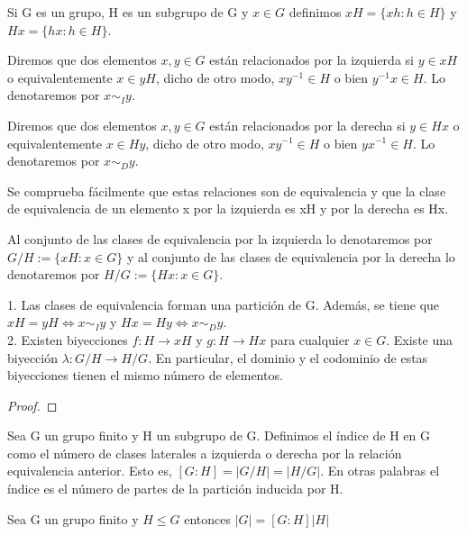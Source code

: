 \begin{definition}
Si G es un grupo, H es un subgrupo de G y $x \in G$ definimos $xH = \{xh:h \in H\}$ y $Hx = \{hx:h \in H\}$.

Diremos que dos elementos $x,y \in G$ están relacionados por la izquierda si $y \in xH$ o equivalentemente $x \in yH$, dicho de otro modo, $xy^{-1} \in H$ o bien $y^{-1}x \in H$. Lo denotaremos por $x \sim_{I} y$.

Diremos que dos elementos $x,y \in G$ están relacionados por la derecha si $y \in Hx$ o equivalentemente $x \in Hy$, dicho de otro modo, $xy^{-1} \in H$ o bien $yx^{-1} \in H$. Lo denotaremos por $x \sim_{D} y$.

Se comprueba fácilmente que estas relaciones son de equivalencia y que la clase de equivalencia de un elemento x por la izquierda es xH y por la derecha es Hx.

Al conjunto de las clases de equivalencia por la izquierda lo denotaremos por $G/H := \{xH : x \in G \}$ y al conjunto de las clases de equivalencia por la derecha lo denotaremos por $H/G := \{Hx : x \in G \}$.
\end{definition}

\begin{proposition}
1. Las clases de equivalencia forman una partición de G. Además, se tiene que $xH = yH \iff x \sim_{I} y$ y $Hx = Hy \iff x \sim_{D} y$. \\
2. Existen biyecciones $f:H \rightarrow xH$ y $g:H \rightarrow Hx$ para cualquier $x \in G$. Existe una biyección $\lambda:G/H \rightarrow H/G$. En particular, el dominio y el codominio de estas biyecciones tienen el mismo número de elementos.
\end{proposition}

\begin{proof}

\end{proof}

\begin{definition}
Sea G un grupo finito y H un subgrupo de G. Definimos el índice de H en G como el número de clases laterales a izquierda o derecha por la relación equivalencia anterior. Esto es, $[G:H] = |G/H| = |H/G|$. En otras palabras el índice es el número de partes de la partición inducida por H.
\end{definition}

\begin{theorem}
Sea G un grupo finito y $H \le G$ entonces $|G| = [G:H]|H|$
\end{theorem}


